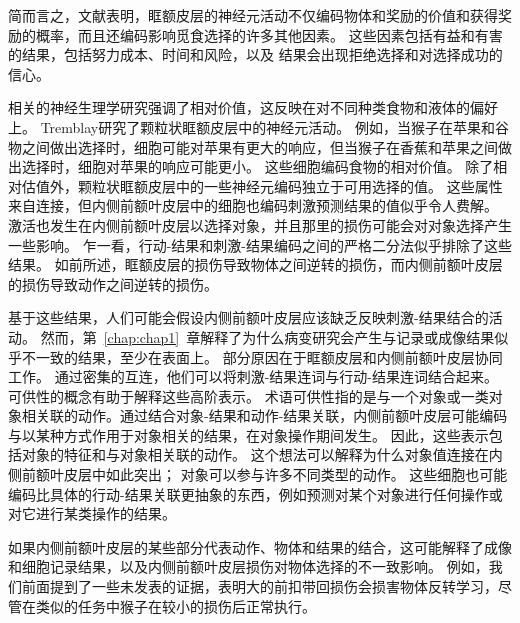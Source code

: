 简而言之，文献表明，眶额皮层的神经元活动不仅编码物体和奖励的价值\cite{padoa2006neurons}和获得奖励的概率\cite{kennerley2009evaluating}，而且还编码影响觅食选择的许多其他因素。
这些因素包括有益和有害的结果\cite{morrison2009convergence}，包括努力成本\cite{kennerley2009evaluating}、时间\cite{roesch2005neuronal}和风险\cite{o2010coding}，以及 结果会出现拒绝选择\cite{abe2011distributed}和对选择成功的信心\cite{kepecs2008neural}。\par


相关的神经生理学研究强调了相对价值，这反映在对不同种类食物和液体的偏好上。
Tremblay\cite{tremblay1999relative}研究了颗粒状眶额皮层中的神经元活动。
例如，当猴子在苹果和谷物之间做出选择时，细胞可能对苹果有更大的响应，但当猴子在香蕉和苹果之间做出选择时，细胞对苹果的响应可能更小。
这些细胞编码食物的相对价值。
除了相对估值外，颗粒状眶额皮层中的一些神经元编码独立于可用选择的值\cite{padoa2009range}。
这些属性来自连接，但内侧前额叶皮层中的细胞也编码刺激预测结果的值似乎令人费解\cite{kennerley2009evaluating}。
激活也发生在内侧前额叶皮层以选择对象\cite{behrens2007learning,glascher2009determining}，并且那里的损伤可能会对对象选择产生一些影响\cite{camille2011double}。
乍一看，行动-结果和刺激-结果编码之间的严格二分法似乎排除了这些结果。
如前所述，眶额皮层的损伤导致物体之间逆转的损伤\cite{rudebeck2006separate}，而内侧前额叶皮层的损伤导致动作之间逆转的损伤\cite{kennerley2006optimal}。\par


基于这些结果，人们可能会假设内侧前额叶皮层应该缺乏反映刺激-结果结合的活动。
然而，第~\ref{chap:chap1}~章解释了为什么病变研究会产生与记录或成像结果似乎不一致的结果，至少在表面上。
部分原因在于眶额皮层和内侧前额叶皮层协同工作。
通过密集的互连，他们可以将刺激-结果连词与行动-结果连词结合起来。
可供性的概念有助于解释这些高阶表示。
术语可供性指的是与一个对象或一类对象相关联的动作。通过结合对象-结果和动作-结果关联，内侧前额叶皮层可能编码与以某种方式作用于对象相关的结果，在对象操作期间发生。
因此，这些表示包括对象的特征和与对象相关联的动作。
这个想法可以解释为什么对象值连接在内侧前额叶皮层中如此突出；
对象可以参与许多不同类型的动作。
这些细胞也可能编码比具体的行动-结果关联更抽象的东西，例如预测对某个对象进行任何操作或对它进行某类操作的结果。\par


如果内侧前额叶皮层的某些部分代表动作、物体和结果的结合，这可能解释了成像和细胞记录结果，以及内侧前额叶皮层损伤对物体选择的不一致影响。
例如，我们前面提到了一些未发表的证据，表明大的前扣带回损伤会损害物体反转学习\cite{murray2006prospective}，尽管在类似的任务中猴子在较小的损伤后正常执行\cite{rudebeck2006separate}。\par


